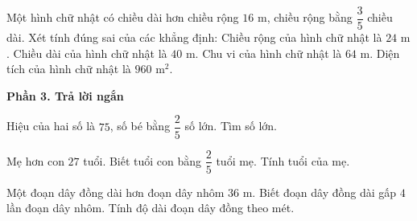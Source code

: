 \begin{ex} %
Một hình chữ nhật có chiều dài hơn chiều rộng $16\text{ m}$, chiều rộng bằng $\dfrac{3}{5}$ chiều dài. Xét tính đúng sai của các khẳng định:
\choiceTF
{\True Chiều rộng của hình chữ nhật là $24\text{ m}$.}
{\True Chiều dài của hình chữ nhật là $40\text{ m}$.}
{Chu vi của hình chữ nhật là $64\text{ m}$.}
{\True Diện tích của hình chữ nhật là $960\text{ m}^2$.}
\end{ex}

\textbf{Phần 3. Trả lời ngắn}

\begin{ex} %
Hiệu của hai số là $75$, số bé bằng $\dfrac{2}{5}$ số lớn. Tìm số lớn.
\end{ex}

\begin{ex} %
Mẹ hơn con $27$ tuổi. Biết tuổi con bằng $\dfrac{2}{5}$ tuổi mẹ. Tính tuổi của mẹ.
\end{ex}

\begin{ex} %
Một đoạn dây đồng dài hơn đoạn dây nhôm $36\text{ m}$. Biết đoạn dây đồng dài gấp $4$ lần đoạn dây nhôm. Tính độ dài đoạn dây đồng theo mét.
\end{ex}


